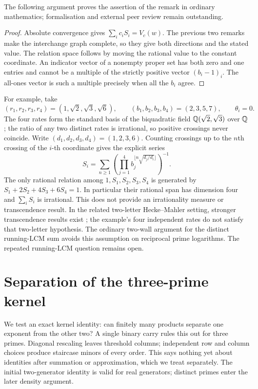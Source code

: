 \documentclass[11pt]{article}
\theoremstyle{remark}
\theoremstyle{plain}
\begin{document}
The following argument proves the assertion of the remark in ordinary
mathematics; formalisation and external peer review remain outstanding.

\begin{proof}
Absolute convergence gives $\sum_i c_iS_i=V_c(w)$.  The previous
two remarks make the interchange graph complete, so they give both
directions and the stated value.  The relation space follows by moving
the rational value to the constant coordinate.  An indicator vector of
a nonempty proper set has both zero and one entries and cannot be a
multiple of the strictly positive vector $(b_i-1)_i$.  The all-ones
vector is such a multiple precisely when all the $b_i$ agree.
\end{proof}

For example, take
\[
 (r_1,r_2,r_3,r_4)=(1,\sqrt2,\sqrt3,\sqrt6),\qquad
 (b_1,b_2,b_3,b_4)=(2,3,5,7),\qquad \theta_i=0.
\]
The four rates form the standard basis of the biquadratic field
$\mathbb{Q}(\sqrt2,\sqrt3)$ over $\mathbb{Q}$; the ratio of any two distinct rates is
irrational, so positive crossings never coincide.  Write
$(d_1,d_2,d_3,d_4)=(1,2,3,6)$.  Counting crossings up to the $n$th
crossing of the $i$-th coordinate gives the explicit series
\begin{equation}\label{long269:eq:four-clocks}
 S_i=\sum_{n\ge1}\left(
       \prod_{j=1}^4 b_j^{\lfloor n\sqrt{d_j/d_i}\rfloor}
                        \right)^{-1}.
\end{equation}
The only rational relation among $1,S_1,S_2,S_3,S_4$ is generated by
$S_1+2S_2+4S_3+6S_4=1$.  In particular their rational span has
dimension four and $\sum_iS_i$ is irrational.  This does not provide an
irrationality measure or transcendence result.  In the related
two-letter Hecke--Mahler setting, stronger transcendence results exist
\cite{bugeaudlaurent2023}; the example's four independent rates do not
satisfy that two-letter hypothesis.  The ordinary two-wall argument for the distinct running-LCM sum avoids
this assumption on reciprocal prime logarithms.  The repeated
running-LCM question remains open.


\section{Separation of the three-prime kernel}\label{long269:sec:rank}

We test an exact kernel identity: can finitely many products separate
one exponent from the other two? A single binary carry rules this out
for three primes. Diagonal rescaling leaves threshold columns; independent
row and column choices produce staircase minors of every order.
This says nothing yet about identities after summation or approximation,
which we treat separately. The initial two-generator identity is valid
for real generators; distinct primes enter the later density argument.
\end{document}
